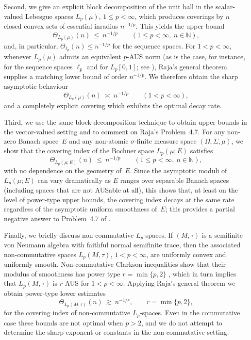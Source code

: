 \documentclass[reqno,11pt]{amsart}
\theoremstyle{plain}
\theoremstyle{definition}
\theoremstyle{remark}
\renewcommand{\le}{\leqslant}
\begin{document}
Second, we give an explicit block decomposition of the unit ball in the scalar-valued Lebesgue spaces $L_p(\mu)$, $1\le p<\infty$, which produces coverings by $n$ closed convex sets of essential inradius $n^{-1/p}$.  This yields the upper bound
\[
\Theta_{L_p(\mu)}(n)\ \le\ n^{-1/p}\qquad(1\le p<\infty,\ n\in\mathbb{N}),
\]
and, in particular, $\Theta_{\ell_p}(n)\le n^{-1/p}$ for the sequence spaces.  For $1<p<\infty$, whenever $L_p(\mu)$ admits an equivalent $p$-AUS norm (as is the case, for instance, for the sequence spaces $\ell_p$ and for $L_p[0,1]$; see \cite{KnaustOdellSchlumprecht1999,RajaAUS}), Raja's general theorem supplies a matching lower bound of order $n^{-1/p}$.  We therefore obtain the sharp asymptotic behaviour
\[
\Theta_{L_p(\mu)}(n)\ \asymp\ n^{-1/p}
\qquad(1<p<\infty),
\]
and a completely explicit covering which exhibits the optimal decay rate.

Third, we use the same block-decomposition technique to obtain upper bounds in the vector-valued setting and to comment on Raja's Problem~4.7.  For any non-zero Banach space~$E$ and any non-atomic $\sigma$-finite measure space $(\Omega,\Sigma,\mu)$, we show that the covering index of the Bochner space $L_p(\mu;E)$ satisfies
\[
\Theta_{L_p(\mu;E)}(n)\ \le\ n^{-1/p}
\qquad(1\le p<\infty,\ n\in\mathbb{N}),
\]
with no dependence on the geometry of~$E$.  Since the asymptotic moduli of $L_p(\mu;E)$ can vary dramatically as $E$ ranges over separable Banach spaces (including spaces that are not AUSable at all), this shows that, at least on the level of power-type upper bounds, the covering index decays at the same rate regardless of the asymptotic uniform smoothness of~$E$; this provides a partial negative answer to Problem~4.7 of \cite{RajaCoveringIndex}.

Finally, we briefly discuss non-commutative $L_p$-spaces.  If $(M,\tau)$ is a semifinite von Neumann algebra with faithful normal semifinite trace, then the associated non-commutative spaces $L_p(M,\tau)$, $1<p<\infty$, are uniformly convex and uniformly smooth.  Non-commutative Clarkson inequalities show that their modulus of smoothness has power type $r=\min\{p,2\}$ \cite{PisierXu}, which in turn implies that $L_p(M,\tau)$ is $r$-AUS for $1<p<\infty$.  Applying Raja's general theorem we obtain power-type lower estimates
\[
\Theta_{L_p(M,\tau)}(n)\ \gtrsim\ n^{-1/r},
\qquad r=\min\{p,2\},
\]
for the covering index of non-commutative $L_p$-spaces.  Even in the commutative case these bounds are not optimal when $p>2$, and we do not attempt to determine the sharp exponent or constants in the non-commutative setting.
\end{document}
